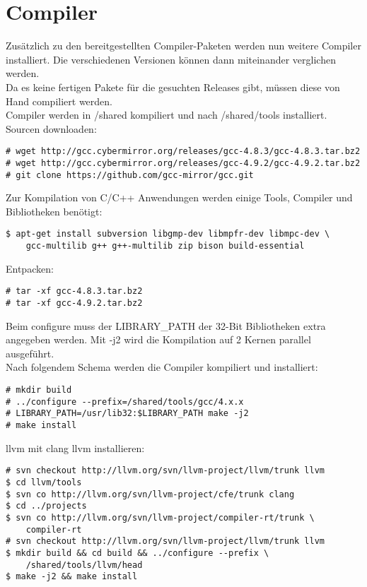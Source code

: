 \chapter{Compiler}
Zusätzlich zu den bereitgestellten Compiler-Paketen werden nun weitere Compiler installiert. Die verschiedenen Versionen können dann miteinander verglichen werden.\\
Da es keine fertigen Pakete für die gesuchten Releases gibt, müssen diese von Hand compiliert werden.\\ 
Compiler werden in /shared kompiliert und nach /shared/tools installiert.\\
Sourcen downloaden:
\begin{lstlisting}[style=Bash]
# wget http://gcc.cybermirror.org/releases/gcc-4.8.3/gcc-4.8.3.tar.bz2
# wget http://gcc.cybermirror.org/releases/gcc-4.9.2/gcc-4.9.2.tar.bz2
# git clone https://github.com/gcc-mirror/gcc.git
\end{lstlisting}
Zur Kompilation von C/C++ Anwendungen werden einige Tools, Compiler und Bibliotheken benötigt:
\begin{lstlisting}[style=Bash]
$ apt-get install subversion libgmp-dev libmpfr-dev libmpc-dev \
	gcc-multilib g++ g++-multilib zip bison build-essential
\end{lstlisting}
Entpacken:
\begin{lstlisting}[style=Bash]
# tar -xf gcc-4.8.3.tar.bz2
# tar -xf gcc-4.9.2.tar.bz2
\end{lstlisting}
Beim configure muss der LIBRARY\_PATH der 32-Bit Bibliotheken extra angegeben werden.
Mit -j2 wird die Kompilation auf 2 Kernen parallel ausgeführt.\\
Nach folgendem Schema werden die Compiler kompiliert und installiert:
\begin{lstlisting}[style=Bash]
# mkdir build 
# ../configure --prefix=/shared/tools/gcc/4.x.x
# LIBRARY_PATH=/usr/lib32:$LIBRARY_PATH make -j2
# make install
\end{lstlisting}
llvm mit clang llvm installieren:
\begin{lstlisting}[style=Bash]
# svn checkout http://llvm.org/svn/llvm-project/llvm/trunk llvm
$ cd llvm/tools
$ svn co http://llvm.org/svn/llvm-project/cfe/trunk clang
$ cd ../projects
$ svn co http://llvm.org/svn/llvm-project/compiler-rt/trunk \
	compiler-rt
# svn checkout http://llvm.org/svn/llvm-project/llvm/trunk llvm
$ mkdir build && cd build && ../configure --prefix \
	/shared/tools/llvm/head
$ make -j2 && make install
\end{lstlisting}
